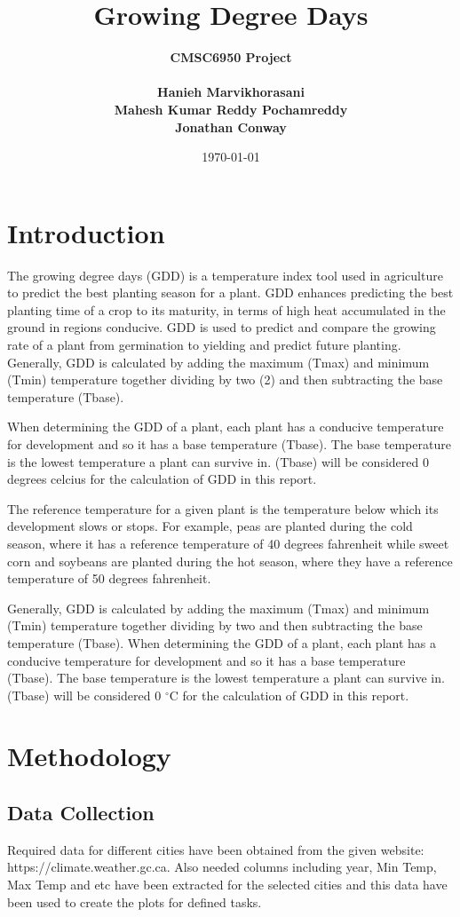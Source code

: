 \documentclass{article}
\title{Growing Degree Days}
\author{\bf{CMSC6950 Project}\\\\Hanieh Marvikhorasani\\ Mahesh Kumar Reddy Pochamreddy\\ Jonathan Conway}
\date{\today}
\begin{document}
	\clearpage\maketitle
	\thispagestyle{empty}

\newpage

\section{ \bf Introduction}
The growing degree days (GDD) is a temperature index tool used in agriculture to predict the best planting season for a plant. GDD enhances predicting the best planting time of a crop to its maturity, in terms of high heat accumulated in the ground in regions conducive. GDD is used to predict and compare the growing rate of a plant from germination to yielding and predict future planting. Generally, GDD is calculated by adding the maximum (Tmax) and minimum (Tmin) temperature together dividing by two (2) and then subtracting the base temperature (Tbase).

\noindent When determining the GDD of a plant, each plant has a conducive temperature for development and so it has a base temperature (Tbase). The base temperature is the lowest temperature a plant can survive in. (Tbase) will be considered 0 degrees celcius for the calculation of GDD in this report.

\noindent The reference temperature for a given plant is the temperature below which its development slows or stops. For example, peas are planted during the cold season, where it has a reference temperature of 40 degrees fahrenheit while sweet corn and soybeans are planted during the hot season, where they have a reference temperature of 50 degrees fahrenheit.


\noindent 
Generally, GDD is calculated by adding the maximum (Tmax) and minimum (Tmin) temperature together dividing by two and then subtracting the base temperature (Tbase). 
When determining the GDD of a plant, each plant has a conducive temperature for development and so it has a base temperature (Tbase). The base temperature is the lowest temperature a plant can survive in. (Tbase) will be considered 0 $^{\circ}$C for the calculation of GDD in this report.


\section{ \bf Methodology}
\subsection{Data Collection}
Required  data  for  different  cities  have  been  obtained  from  the  given  website:
https://climate.weather.gc.ca.  Also needed columns including year, Min Temp,
Max  Temp  and  etc  have  been  extracted  for  the  selected  cities  and  this  data
have  been  used  to  create  the  plots  for  defined  tasks.   
\end{document}
